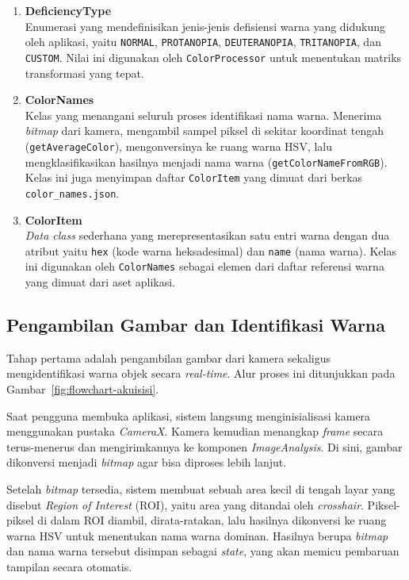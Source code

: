 \begin{enumerate}
  \item \textbf{DeficiencyType} \\
  Enumerasi yang mendefinisikan jenis-jenis defisiensi warna yang didukung oleh aplikasi, yaitu \texttt{NORMAL}, \texttt{PROTANOPIA}, \texttt{DEUTERANOPIA}, \texttt{TRITANOPIA}, dan \texttt{CUSTOM}.
  Nilai ini digunakan oleh \texttt{ColorProcessor} untuk menentukan matriks transformasi yang tepat.

  \item \textbf{ColorNames} \\
  Kelas yang menangani seluruh proses identifikasi nama warna.
  Menerima \textit{bitmap} dari kamera, mengambil sampel piksel di sekitar koordinat tengah (\texttt{getAverageColor}), mengonversinya ke ruang warna HSV, lalu mengklasifikasikan hasilnya menjadi nama warna (\texttt{getColorNameFromRGB}).
  Kelas ini juga menyimpan daftar \texttt{ColorItem} yang dimuat dari berkas \texttt{color\_names.json}.

  \item \textbf{ColorItem} \\
  \textit{Data class} sederhana yang merepresentasikan satu entri warna dengan dua atribut yaitu \texttt{hex} (kode warna heksadesimal) dan \texttt{name} (nama warna).
  Kelas ini digunakan oleh \texttt{ColorNames} sebagai elemen dari daftar referensi warna yang dimuat dari aset aplikasi.
\end{enumerate}

\subsection{Pengambilan Gambar dan Identifikasi Warna}

Tahap pertama adalah pengambilan gambar dari kamera sekaligus mengidentifikasi warna objek secara \textit{real-time}.
Alur proses ini ditunjukkan pada Gambar~\ref{fig:flowchart-akuisisi}.

Saat pengguna membuka aplikasi, sistem langsung menginisialisasi kamera menggunakan pustaka \textit{CameraX}.
Kamera kemudian menangkap \textit{frame} secara terus-menerus dan mengirimkannya ke komponen \textit{ImageAnalysis}.
Di sini, gambar dikonversi menjadi \textit{bitmap} agar bisa diproses lebih lanjut.

Setelah \textit{bitmap} tersedia, sistem membuat sebuah area kecil di tengah layar yang disebut \textit{Region of Interest} (ROI), yaitu area yang ditandai oleh \textit{crosshair}.
Piksel-piksel di dalam ROI diambil, dirata-ratakan, lalu hasilnya dikonversi ke ruang warna HSV untuk menentukan nama warna dominan.
Hasilnya berupa \textit{bitmap} dan nama warna tersebut disimpan sebagai \textit{state}, yang akan memicu pembaruan tampilan secara otomatis.

